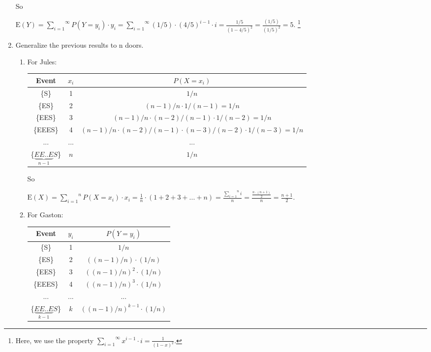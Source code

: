 \documentclass[12pt,thmsa]{article}\usepackage[]{graphicx}\usepackage[]{color}
\begin{document}
\begin{enumerate}
So
\begin{center}
$\mbox{E}(Y) = \overset{\infty}{\underset{i=1}{\sum}}P(Y=y_i)\cdot y_i = \overset{\infty}{\underset{i=1}{\sum}}(1/5)\cdot(4/5)^{i-1}\cdot i=\frac{1/5}{(1-4/5)^2}=\frac{(1/5)}{(1/5)^2}=5. $\hspace{0.05cm} \footnote{Here, we use the property $\overset{\infty}{\underset{i=1}{\sum}}x^{i-1}\cdot i=\frac{1}{(1-x)^2}$.}
\end{center}

\item Generalize the previous results to n doors.
\begin{enumerate}%
\item For Jules:

\begin{center}
\begin{tabular}{|c|c|c|}
\hline
Event & $x_i$ & $P(X=x_i)$ \\[1mm]
\hline
\{S\} & 1 & $1/n$\\[1mm]
\hline
\{ES\} & 2 & $(n-1)/n\cdot 1/(n-1)=1/n$\\[1mm]
\hline
\{EES\} & 3 & $(n-1)/n\cdot (n-2)/(n-1)\cdot 1/(n-2)=1/n$\\[1mm]
\hline
\{EEES\} & 4 & $(n-1)/n\cdot (n-2)/(n-1)\cdot (n-3)/(n-2)\cdot1/(n-3)=1/n $\\[1mm]
\hline
... & ... & ... \\[1mm]
\hline
\{$\underset{n-1}{\underbrace{EE..E}}S$\} & $n$ & $1/n$\\[1mm]
\hline
\end{tabular}
\end{center}

So
\begin{center}
$\mbox{E}(X) = \overset{n}{\underset{i=1}{\sum}}P(X=x_i)\cdot x_i = \frac{1}{n} \cdot(1+2+3+...+n)=\frac{\overset{n}{\underset{i=1}{\sum}}i}{n}=\frac{\frac{n\cdot(n+1)}{2}}{n}=\frac{n+1}{2}.$
\end{center}

\medskip

\item For Gaston:

\begin{center}
\begin{tabular}{|c|c|c|}
\hline
Event & $y_i$ & $P(Y=y_i)$ \\[1mm]
\hline
\{S\} & 1 & $1/n$\\[1mm]
\hline
\{ES\} & 2 & $((n-1)/n)\cdot (1/n)$\\[1mm]
\hline
\{EES\} & 3 & $((n-1)/n)^2\cdot (1/n)$\\[1mm]
\hline
\{EEES\} & 4 & $((n-1)/n)^3\cdot (1/n) $\\[1mm]
\hline
... & ... & ... \\[1mm]
\hline
\{$\underset{k-1}{\underbrace{EE..E}}S$\} & $k$ & $((n-1)/n)^{k-1}\cdot(1/n)$\\[1mm]
\hline
\end{tabular}
\end{center}


\end{enumerate}
\end{enumerate}
\end{document}
